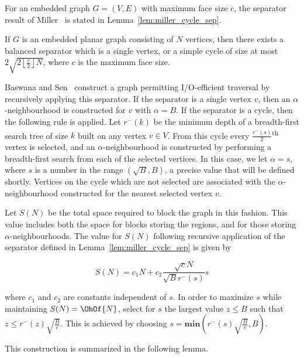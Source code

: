 {For an embedded graph $G=(V,E)$ with maximum face size $c$,
the separator result of Miller~\cite{miller_1986} is 
stated in Lemma~\ref{lem:miller_cycle_sep}.

\begin{lemma}\label{lem:miller_cycle_sep}
If $G$ is an embedded planar graph consisting of $N$ vertices, then
there exists a balanced separator which is a single vertex, or a simple cycle
of size at most $2 \sqrt{2 \left\lfloor \frac{c}{2} \right\rfloor N}$,
where $c$ is the maximum face size.
\end{lemma}

Baswana and Sen~\cite{DBLP:journals/algorithmica/BaswanaS02}
construct a graph permitting {I/O}-efficient traversal by recursively
applying this separator.
If the separator is a single vertex $v$, then an $\alpha$-neighbourhood
is constructed for $v$ with $\alpha = B$. 
If the separator is a cycle, then the following rule is applied.
Let $r^{-}(k)$ be the minimum depth of a
breadth-first search tree of size $k$ built on any vertex $v \in
V$.
From this cycle every $\frac{r^{-}(s)}{2}$\textsuperscript{th}
vertex is selected, and an $\alpha$-neighbourhood is constructed 
by performing a breadth-first search from each of the selected 
vertices.
In this case, we let $\alpha=s$, where $s$ is
a number in the range $(\sqrt{B},B)$, a precise value that will be
defined shortly.
Vertices on the cycle which are not selected are associated with the
$\alpha$-neighbourhood constructed for the nearest selected vertex $v$.

Let $S(N)$ be the total space required to block 
the graph in this fashion.
This value includes both the space for blocks storing the
regions, and for those storing $\alpha$-neighbourhoods.
The value for $S(N)$ following recursive application of the 
separator defined in Lemma~\ref{lem:miller_cycle_sep} is
given by

\begin{equation}
  S(N) = c_1N + c_2\frac{\sqrt{c}N}{\sqrt{B}r^{-}(s)} s
\end{equation}

where $c_1$ and $c_2$ are constants independent of $s$.
In order to maximize $s$ while maintaining $S(N) = \OhOf{N}$,
select for $s$ the largest value $z \le B$ such that 
$z \le r^{-}(z)\sqrt{\frac{B}{c}}$.
This is achieved by choosing 
$s = \textbf{min}\left(r^{-}(s)\sqrt{\frac{B}{c}}, B \right)$.

This construction is summarized in the following lemma.

}
